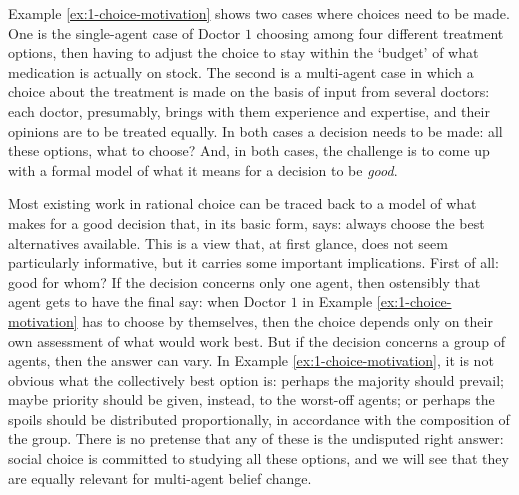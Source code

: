 Example \ref{ex:1-choice-motivation} shows two cases 
where choices need to be made.
One is the single-agent case of Doctor $1$ choosing among 
four different treatment options, 
then having to adjust the choice to stay within the `budget'
of what medication is actually on stock.
The second is a multi-agent case in which a choice 
about the treatment is made on the basis of input 
from several doctors: 
each doctor, presumably, brings with them experience 
and expertise, and their opinions are to be treated equally. 
In both cases a decision needs to be made: 
all these options, what to choose? 
And, in both cases, the challenge is to come up 
with a formal model of what it 
means for a decision to be \emph{good}.  

Most existing work in rational choice can be traced back to
a model of what makes for a good decision 
that, in its basic form, says:
always choose the best alternatives available.
This is a view that, at first glance, does not seem particularly informative,
but it carries some important implications.
First of all: good for whom?
If the decision concerns only one agent, then ostensibly 
that agent gets to have the final say:
when Doctor $1$ in Example \ref{ex:1-choice-motivation} has to choose 
by themselves, then the choice depends only on their own assessment 
of what would work best.
But if the decision concerns a group of agents, 
then the answer can vary.
In Example \ref{ex:1-choice-motivation}, 
it is not obvious what the collectively best option is:
perhaps the majority should prevail;
maybe priority should be given, instead, 
to the worst-off agents;
or perhaps the spoils should be distributed proportionally,
in accordance with the composition of the group.
There is no pretense that any of these is the 
undisputed right answer: 
social choice is committed to studying all these options,
and we will see that they are equally relevant for multi-agent
belief change.

